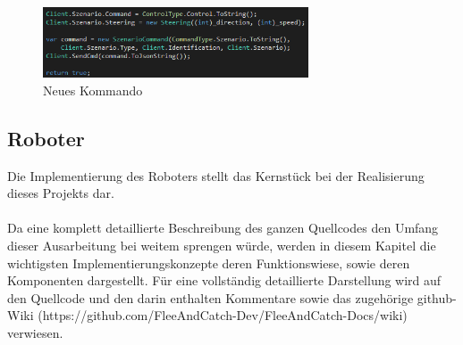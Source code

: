 \begin{figure}[h]
	\begin{center}
		\includegraphics[width=0.7\textwidth]{images/implementation/newcommand.png}
	\end{center}	
	\caption{Neues Kommando}
	\label{fig:newcommand}
\end{figure}

\subsection{Roboter}
Die Implementierung des Roboters stellt das Kernstück bei der Realisierung dieses Projekts dar. 
\\
\\
Da eine komplett detaillierte Beschreibung des ganzen Quellcodes den Umfang dieser Ausarbeitung bei weitem sprengen würde,
werden in diesem Kapitel die wichtigsten Implementierungskonzepte deren Funktionswiese, sowie deren Komponenten dargestellt. 
Für eine vollständig detaillierte Darstellung wird auf den Quellcode und den darin enthalten Kommentare sowie das zugehörige 
github-Wiki (https://github.com/FleeAndCatch-Dev/FleeAndCatch-Docs/wiki) verwiesen.
